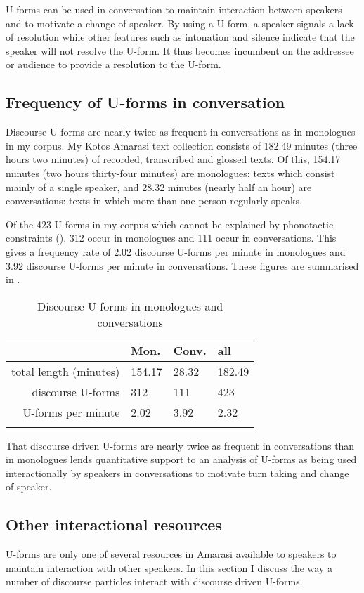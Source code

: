 U-forms can be used in conversation to maintain interaction
between speakers and to motivate a change of speaker.
By using a U-form, a speaker signals a lack of resolution
while other features such as intonation
and silence indicate that the speaker will not resolve the U-form.
It thus becomes incumbent on the addressee or audience
to provide a resolution to the U-form.

\subsection{Frequency of U-forms in conversation}\label{sec:FreUfoCon}
Discourse U-forms are nearly twice as frequent in conversations as in monologues in my corpus.
My Kotos Amarasi text collection consists of 182.49 minutes (three hours two minutes)
of recorded, transcribed and glossed texts.
Of this, 154.17 minutes (two hours thirty-four minutes)
are monologues: texts which consist mainly of a single speaker,
and 28.32 minutes (nearly half an hour) are conversations:
texts in which more than one person regularly speaks.

Of the 423 U-forms in my corpus which
cannot be explained by phonotactic constraints (),
312 occur in monologues and 111 occur in conversations.
This gives a frequency rate of 2.02 discourse U-forms per minute in monologues
and 3.92 discourse U-forms per minute in conversations.
These figures are summarised in .

\begin{table}[h]
	\caption{Discourse U-forms in monologues and conversations}\label{tab:VerUfoConMon}
	\centering
		\begin{tabular}{rlll} \lsptoprule
															& Mon.	& Conv. & all			\\ \midrule
			total length (minutes)	& 154.17& 28.32	& 182.49	\\
			discourse U-forms				& 312		& 111		& 423			\\
			U-forms per minute			&	2.02	&	3.92	&	2.32		\\
			\lspbottomrule
		\end{tabular}
\end{table}

That discourse driven U-forms are nearly twice as frequent in conversations
than in monologues lends quantitative support to an analysis of U-forms
as being used interactionally by speakers in conversations
to motivate turn taking and change of speaker.

\subsection{Other interactional resources}\label{sec:OthIntRes}
U-forms are only one of several resources in Amarasi
available to speakers to maintain interaction with other speakers.
In this section I discuss the way a number of discourse particles
interact with discourse driven U-forms.

